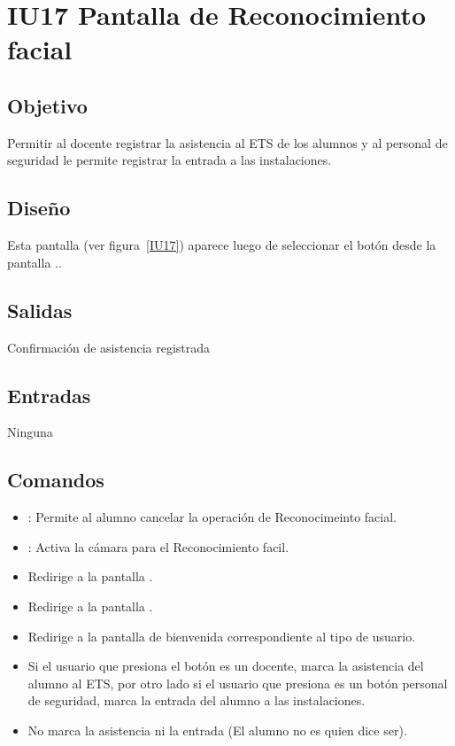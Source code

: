 \section{IU17 Pantalla de Reconocimiento facial}

\subsection{Objetivo}
Permitir al docente registrar la asistencia al ETS de los alumnos y al personal de seguridad le permite registrar la entrada a las instalaciones.

\subsection{Diseño}
Esta pantalla  (ver figura~\ref{IU17}) aparece luego de seleccionar el botón  desde la pantalla ..



\subsection{Salidas}
Confirmación de asistencia registrada

\subsection{Entradas}
Ninguna

\subsection{Comandos}
\begin{itemize}
    \item {}: Permite al alumno cancelar la operación de Reconocimeinto facial.
    \item {}: Activa la cámara para el Reconocimiento facil. 
    \item {} Redirige a la pantalla .
    \item {} Redirige a la pantalla .
    \item {} Redirige a la pantalla de bienvenida correspondiente al tipo de usuario.
    \item {} Si el usuario que presiona el botón es un docente, marca la asistencia del alumno al ETS, por otro lado si el usuario que presiona es un botón personal de seguridad, marca la entrada del alumno a las instalaciones.
    \item {} No marca la asistencia ni la entrada (El alumno no es quien dice ser).
\end{itemize}

